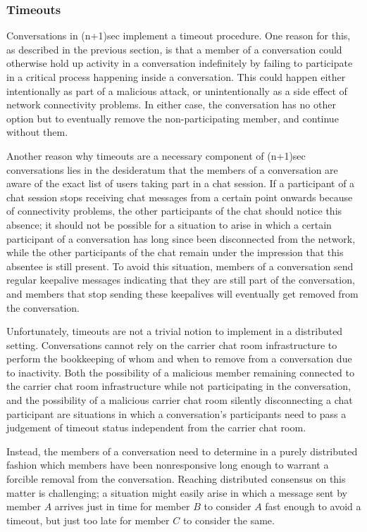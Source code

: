 \documentclass{article}
\begin{document}
\subsubsection{Timeouts}
\label{sec:conversation-state-machine/contents/timeouts}

Conversations in (n+1)sec implement a timeout procedure.
One reason for this, as described in the previous section, is that a member of a conversation could otherwise hold up activity in a conversation indefinitely by failing to participate in a critical process happening inside a conversation.
This could happen either intentionally as part of a malicious attack, or unintentionally as a side effect of network connectivity problems.
In either case, the conversation has no other option but to eventually remove the non-participating member, and continue without them.

Another reason why timeouts are a necessary component of (n+1)sec conversations lies in the desideratum that the members of a conversation are aware of the exact list of users taking part in a chat session.
If a participant of a chat session stops receiving chat messages from a certain point onwards because of connectivity problems, the other participants of the chat should notice this absence; it should not be possible for a situation to arise in which a certain participant of a conversation has long since been disconnected from the network, while the other participants of the chat remain under the impression that this absentee is still present.
To avoid this situation, members of a conversation send regular keepalive messages indicating that they are still part of the conversation, and members that stop sending these keepalives will eventually get removed from the conversation.

Unfortunately, timeouts are not a trivial notion to implement in a distributed setting.
Conversations cannot rely on the carrier chat room infrastructure to perform the bookkeeping of whom and when to remove from a conversation due to inactivity.
Both the possibility of a malicious member remaining connected to the carrier chat room infrastructure while not participating in the conversation, and the possibility of a malicious carrier chat room silently disconnecting a chat participant are situations in which a conversation's participants need to pass a judgement of timeout status independent from the carrier chat room.

Instead, the members of a conversation need to determine in a purely distributed fashion which members have been nonresponsive long enough to warrant a forcible removal from the conversation.
Reaching distributed consensus on this matter is challenging; a situation might easily arise in which a message sent by member $A$ arrives just in time for member $B$ to consider $A$ fast enough to avoid a timeout, but just too late for member $C$ to consider the same.
\end{document}
